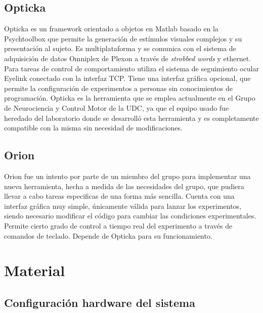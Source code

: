 \documentclass[conference]{IEEEtran}
\begin{document}
\subsection{Opticka}

Opticka\cite{opticka} es un framework orientado a objetos en Matlab basado en la Psychtoolbox que permite la generación de estímulos visuales complejos y su presentación al sujeto. Es multiplataforma y se comunica con el sistema de adquisición de datos Omniplex\cite{omniplex} de Plexon a través de \textit{strobbed words} y ethernet. Para tareas de control de comportamiento utiliza el sistema de seguimiento ocular Eyelink conectado con la interfaz TCP. 
Tiene una interfaz gráfica opcional, que permite la configuración de experimentos a personas sin conocimientos de programación.
Opticka es la herramienta que se emplea actualmente en el Grupo de Neurociencia y Control Motor de la UDC, ya que el equipo usado fue heredado del laboratorio donde se desarrolló esta herramienta y es completamente compatible con la misma sin necesidad de modificaciones.



\subsection{Orion}

Orion fue un intento por parte de un miembro del grupo para implementar una nueva herramienta, hecha a medida de las necesidades del grupo, que pudiera llevar a cabo tareas especificas de una forma más sencilla. Cuenta con una interfaz gráfica muy simple, únicamente válida para lanzar los experimentos, siendo necesario modificar el código para cambiar las condiciones experimentales. Permite cierto grado de control a tiempo real del experimento a través de comandos de teclado.
Depende de Opticka para su funcionamiento.


\section{Material}

\subsection{Configuración hardware del sistema}
\end{document}
